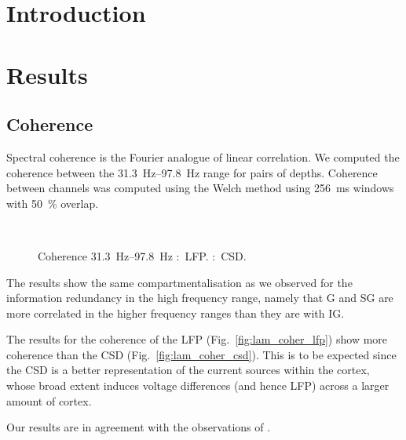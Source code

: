 \section{Introduction}

\section{Results}

\subsection{Coherence}

Spectral coherence is the Fourier analogue of linear correlation.
We computed the coherence between the \SIrange{31.3}{97.8}{Hz} range for pairs of depths.
Coherence between channels was computed using the Welch method using \SI{256}{\milli\second} windows with \SI{50}{\percent} overlap.

\begin{figure}[htb]
    \centering
    ~~
    \caption{Coherence \SIrange{31.3}{97.8}{Hz}
\protect{}:~\ac{LFP}.
\protect{}:~\ac{CSD}.
}
\label{fig:lam_coher}
\end{figure}

The results show the same compartmentalisation as we observed for the information redundancy in the high frequency range, namely that \ac{G} and \ac{SG} are more correlated in the higher frequency ranges than they are with \ac{IG}.

The results for the coherence of the \ac{LFP} (Fig.~\ref{fig:lam_coher_lfp}) show more coherence than the \ac{CSD} (Fig.~\ref{fig:lam_coher_csd}).
This is to be expected since the \ac{CSD} is a better representation of the current sources within the cortex, whose broad extent induces voltage differences (and hence \ac{LFP}) across a larger amount of cortex.

Our results are in agreement with the observations of \citet[Figure 5B]{Maier2010}.


